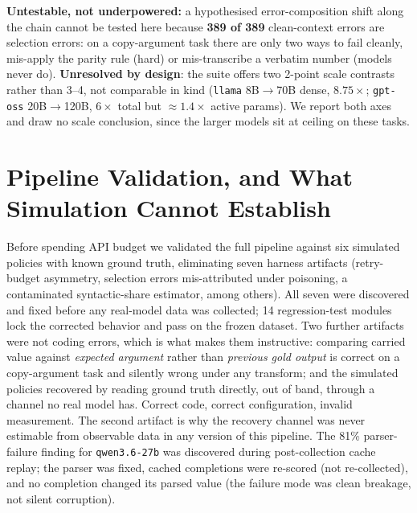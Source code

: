 \documentclass{article}
\begin{document}
\textbf{Untestable, not underpowered:} a hypothesised error-composition shift along the chain cannot be tested here because \textbf{389 of 389} clean-context errors are selection errors: on a copy-argument task there are only two ways to fail cleanly, mis-apply the parity rule (hard) or mis-transcribe a verbatim number (models never do). \textbf{Unresolved by design}: the suite offers two 2-point scale contrasts rather than 3--4, not comparable in kind (\texttt{llama} 8B$\to$70B dense, $8.75\times$; \texttt{gpt-oss} 20B$\to$120B, $6\times$ total but $\approx1.4\times$ active params). We report both axes and draw no scale conclusion, since the larger models sit at ceiling on these tasks.

\section{Pipeline Validation, and What Simulation Cannot Establish}
\label{sec:validation}

Before spending API budget we validated the full pipeline against six simulated policies with known ground truth, eliminating seven harness artifacts (retry-budget asymmetry, selection errors mis-attributed under poisoning, a contaminated syntactic-share estimator, among others). All seven were discovered and fixed before any real-model data was collected; 14 regression-test modules lock the corrected behavior and pass on the frozen dataset. Two further artifacts were not coding errors, which is what makes them instructive: comparing carried value against \emph{expected argument} rather than \emph{previous gold output} is correct on a copy-argument task and silently wrong under any transform; and the simulated policies recovered by reading ground truth directly, out of band, through a channel no real model has. Correct code, correct configuration, invalid measurement. The second artifact is why the recovery channel was never estimable from observable data in any version of this pipeline. The 81\% parser-failure finding for \texttt{qwen3.6-27b} was discovered during post-collection cache replay; the parser was fixed, cached completions were re-scored (not re-collected), and no completion changed its parsed value (the failure mode was clean breakage, not silent corruption).
\end{document}
